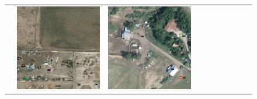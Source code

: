 \begin{figure}[h!]
\begin{tabularx}{\textwidth}{c|*{9}{X}}
    & \includegraphics[trim={360pt 200pt 540pt 715pt},clip,width=\linewidth]{images/015Results/01abb_vs_obb/comp_images/aab_old/212.png}
    & \includegraphics[trim={730pt 220pt 200pt 720pt},clip,width=\linewidth]{images/015Results/01abb_vs_obb/comp_images/aab_old/523.png}

\end{tabularx}
\end{figure}
